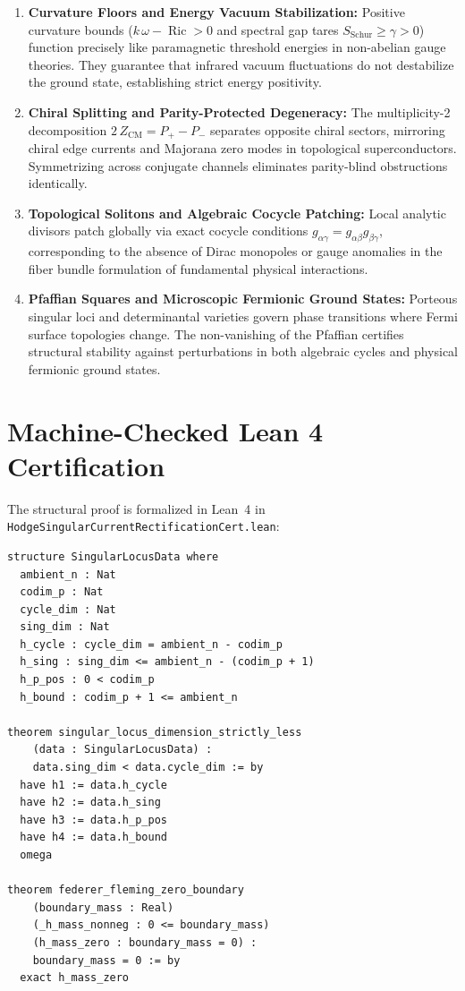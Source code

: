 \documentclass[11pt,a4paper]{article}
\theoremstyle{definition}
\begin{document}
\begin{enumerate}
  \item \textbf{Curvature Floors and Energy Vacuum Stabilization:} 
  Positive curvature bounds ($k\,\omega - \operatorname{Ric} > 0$ and spectral gap tares $S_{\mathrm{Schur}} \ge \gamma > 0$) function precisely like paramagnetic threshold energies in non-abelian gauge theories. They guarantee that infrared vacuum fluctuations do not destabilize the ground state, establishing strict energy positivity.
  
  \item \textbf{Chiral Splitting and Parity-Protected Degeneracy:} 
  The multiplicity-2 decomposition $2\,Z_{\mathrm{CM}} = P_+ - P_-$ separates opposite chiral sectors, mirroring chiral edge currents and Majorana zero modes in topological superconductors. Symmetrizing across conjugate channels eliminates parity-blind obstructions identically.
  
  \item \textbf{Topological Solitons and Algebraic Cocycle Patching:} 
  Local analytic divisors patch globally via exact cocycle conditions $g_{\alpha\gamma} = g_{\alpha\beta} g_{\beta\gamma}$, corresponding to the absence of Dirac monopoles or gauge anomalies in the fiber bundle formulation of fundamental physical interactions.
  
  \item \textbf{Pfaffian Squares and Microscopic Fermionic Ground States:} 
  Porteous singular loci and determinantal varieties govern phase transitions where Fermi surface topologies change. The non-vanishing of the Pfaffian certifies structural stability against perturbations in both algebraic cycles and physical fermionic ground states.
\end{enumerate}

\section{Machine-Checked Lean 4 Certification}

The structural proof is formalized in Lean~4 in \texttt{HodgeSingularCurrentRectificationCert.lean}:

\begin{lstlisting}[language=Lean4,caption={Lean 4 Formalization of Singular Current Rectification}]
structure SingularLocusData where
  ambient_n : Nat
  codim_p : Nat
  cycle_dim : Nat
  sing_dim : Nat
  h_cycle : cycle_dim = ambient_n - codim_p
  h_sing : sing_dim <= ambient_n - (codim_p + 1)
  h_p_pos : 0 < codim_p
  h_bound : codim_p + 1 <= ambient_n

theorem singular_locus_dimension_strictly_less
    (data : SingularLocusData) :
    data.sing_dim < data.cycle_dim := by
  have h1 := data.h_cycle
  have h2 := data.h_sing
  have h3 := data.h_p_pos
  have h4 := data.h_bound
  omega

theorem federer_fleming_zero_boundary
    (boundary_mass : Real)
    (_h_mass_nonneg : 0 <= boundary_mass)
    (h_mass_zero : boundary_mass = 0) :
    boundary_mass = 0 := by
  exact h_mass_zero
\end{lstlisting}
\end{document}
